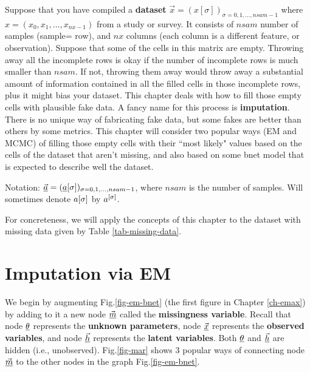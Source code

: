Suppose that you
have compiled a {\bf dataset}
$\vec{x}=(x[\sigma])_{\sigma=0, 1, \ldots,
nsam-1}$
where $x=(x_0, x_1, \ldots,x_{ nx-1})$
from a study or survey.
It consists 
of $nsam$ number 
of samples (sample= row), 
and $nx$ columns (each column is a different 
feature, or observation).
Suppose that some of the
cells
in this matrix 
are empty.
Throwing
away all the incomplete
rows is okay 
if the 
number
of incomplete rows
is much smaller  than
$nsam$.
If not,
throwing 
them
away would
throw away
a substantial amount of
information 
contained in all the
filled cells
in those incomplete rows, 
plus it might
bias your dataset.
This chapter
deals with
how to fill
those empty cells 
with plausible
fake data.
A fancy name
for this process
is {\bf imputation}.
There is no unique
way of 
fabricating
fake data,
but
some fakes
are
better than others
by some metrics.
This chapter will
consider
two popular
ways (EM
and MCMC)
of 
filling those
empty 
cells
with
their
``most likely" values
based on the cells
of the dataset that
aren't missing,
and
also based
on some bnet
model
that is 
expected to describe well the
dataset.

Notation:
$\vec{{\underline{a}}}=
({\underline{a}}[\sigma])_{\sigma=0, 1, \ldots,nsam-1}
$, where $nsam$
is the number of samples.
Will
sometimes
denote
$a{[\sigma]}$ by $a^{[\sigma]}$.


For concreteness,
we will
apply
the concepts
of this chapter
to
the dataset
with missing data
given by Table \ref{tab-missing-data}.


\section{Imputation via EM}

We begin by augmenting
Fig.\ref{fig-em-bnet} (the first figure
in Chapter \ref{ch-emax})
by adding to it a new node
$\vec{{\underline{m}}}$
called the
{\bf missingness variable}.
Recall
that node
$\underline{\theta}$
represents
the {\bf unknown parameters},
node $\vec{{\underline{x}}}$
represents the
{\bf observed variables},
and 
node $\vec{{\underline{h}}}$
represents the {\bf latent
variables}.
Both $\underline{\theta}$
and $\vec{{\underline{h}}}$
are hidden (i.e., unobserved).
Fig.\ref{fig-mar}
shows
3
popular
ways of 
connecting node $\vec{{\underline{m}}}$
 to the
other nodes
in the graph Fig.\ref{fig-em-bnet}.



